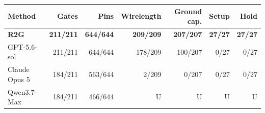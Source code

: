 \begin{tabular}{lrrrrrr}\toprule
Method & Gates & Pins & Wirelength & Ground cap. & Setup & Hold\\\midrule
\textbf{R2G} & \textbf{211/211} & \textbf{644/644} & \textbf{209/209} & \textbf{207/207} & \textbf{27/27} & \textbf{27/27}\\
GPT-5.6-sol & 211/211 & 644/644 & 178/209 & 100/207 & 0/27 & 0/27\\
Claude Opus 5 & 184/211 & 563/644 & 2/209 & 0/207 & 0/27 & 0/27\\
Qwen3.7-Max & 184/211 & 466/644 & U & U & U & U\\
\bottomrule\end{tabular}
